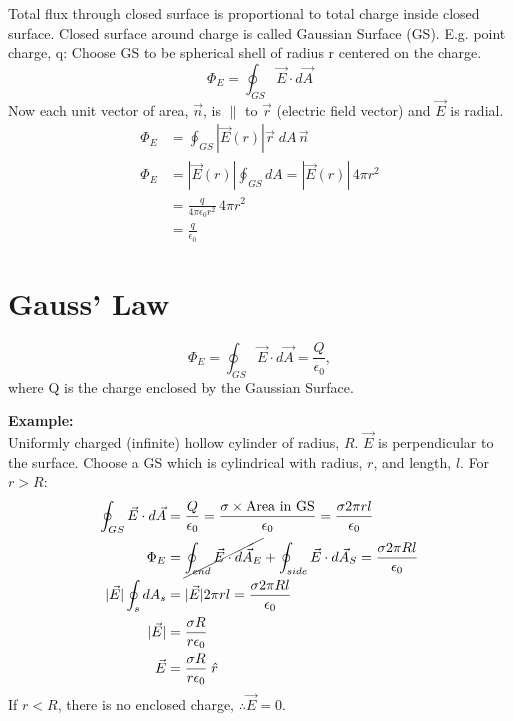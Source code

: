 \documentclass[a4paper, 11pt, normalem]{report}
\begin{document}
Total flux through closed surface is proportional to total charge inside closed surface.
Closed surface around charge is called Gaussian Surface (GS).
E.g. point charge, q: Choose GS to be spherical shell of radius r centered on the charge.
\begin{equation}
    \Phi_{E} = \oint_{GS} \vec{E} \cdot d\vec{A}
\end{equation}
Now each unit vector of area, $\vec{n}$, is $\parallel$ to $\vec{r}$ (electric field vector) and $\vec{E}$ is radial.
\begin{align}
    \Phi_{E} &= \oint_{GS} |\vec{E}(r)| \vec{r} \; dA \, \vec{n} \\
    \Phi_{E} &= |\vec{E}(r)| \oint_{GS} dA = |\vec{E}(r)|\, 4\pi r^{2} \\
             &= \frac{q}{4\pi\epsilon_{0}r^{2}}\, 4\pi r^{2} \\
             &= \frac{q}{\epsilon_{0}}
\end{align}

\section{Gauss' Law}
\begin{equation}
    \Phi_{E} = \oint_{GS} \vec{E} \cdot d\vec{A} = \frac{Q}{\epsilon_{0}},
\end{equation}
where Q is the charge enclosed by the Gaussian Surface.

\textbf{Example:}\\
Uniformly charged (infinite) hollow cylinder of radius, $R$.
$\vec{E}$ is perpendicular to the surface.
Choose a GS which is cylindrical with radius, $r$, and length, $l$.
For $r > R$:
\begin{align}
    \oint_{GS} \vec{E} \cdot d\vec{A} &= \frac{Q}{\epsilon_{0}} = \frac{\sigma \times \text{Area in GS}}{\epsilon_{0}} = \frac{\sigma 2\pi r l}{\epsilon_{0}} \\
    \Phi_{E} &= \cancel{\oint_{end} \vec{E} \cdot d\vec{A}_{E}} + \oint_{side} \vec{E} \cdot d\vec{A}_{S} = \frac{\sigma 2\pi R l}{\epsilon_{0}}\\
    |\vec{E}| \oint_{s} dA_{s} &= |\vec{E}| 2\pi r l = \frac{\sigma 2\pi R l}{\epsilon_{0}} \\
    |\vec{E}| &= \frac{\sigma R}{r \epsilon_{0}} \\
    \vec{E} &= \frac{\sigma R}{r \epsilon_{0}} \; \hat{r}
\end{align}
If $r < R$, there is no enclosed charge, $\therefore \vec{E} = 0$.
\end{document}
